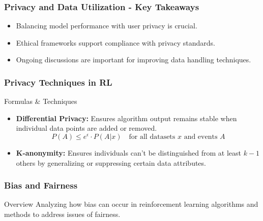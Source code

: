 \documentclass[aspectratio=169]{beamer}
\begin{document}
\begin{frame}[fragile]
    \frametitle{Privacy and Data Utilization - Key Takeaways}
    \begin{itemize}
        \item Balancing model performance with user privacy is crucial.
        \item Ethical frameworks support compliance with privacy standards.
        \item Ongoing discussions are important for improving data handling techniques.
    \end{itemize}
\end{frame}

\begin{frame}[fragile]
    \frametitle{Privacy Techniques in RL}
    \begin{block}{Formulas & Techniques}
        \begin{itemize}
            \item \textbf{Differential Privacy:} Ensures algorithm output remains stable when individual data points are added or removed.
            \[
            P(A) \leq e^{\epsilon} \cdot P(A | x) \quad \text{for all datasets } x \text{ and events } A
            \]
            \item \textbf{K-anonymity:} Ensures individuals can't be distinguished from at least \( k-1 \) others by generalizing or suppressing certain data attributes.
        \end{itemize}
    \end{block}
\end{frame}

\begin{frame}[fragile]
    \frametitle{Bias and Fairness}
    \begin{block}{Overview}
        Analyzing how bias can occur in reinforcement learning algorithms and methods to address issues of fairness.
    \end{block}
\end{frame}
\end{document}
